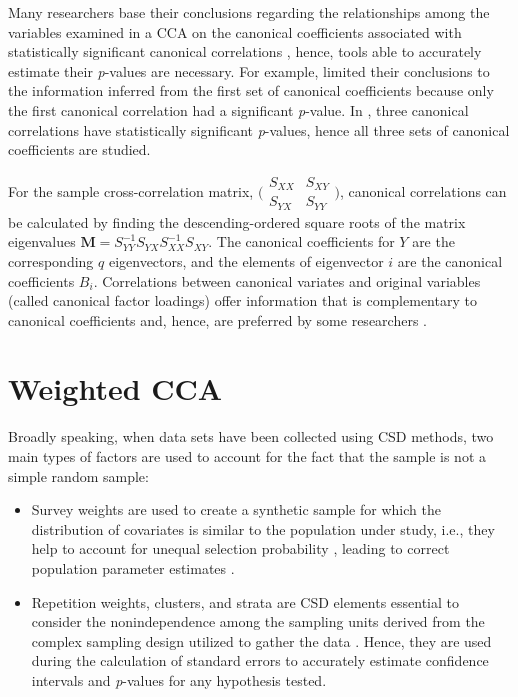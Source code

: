 Many researchers base their conclusions regarding the relationships among the variables examined in a CCA on the canonical coefficients associated with statistically significant canonical correlations \citep{boedeker2020} \citep{statsoft1997}, hence, tools able to accurately estimate their \emph{p}-values are necessary. For example, \citep{trav2014} limited their conclusions to the information inferred from the first set of canonical coefficients because only the first canonical correlation had a significant \emph{p}-value. In \citep{stow1980}, three canonical correlations have statistically significant \emph{p}-values, hence all three sets of canonical coefficients are studied.

For the sample cross-correlation matrix,
\(\big(\begin{smallmatrix}  S_{XX} & S_{XY}\\  S_{YX} & S_{YY} \end{smallmatrix}\big)\),
canonical correlations can be calculated by finding the descending-ordered square roots of the matrix eigenvalues \(\mathbf{M} = S_{YY}^{-1}S_{YX}S_{XX}^{-1}S_{XY}\). The canonical coefficients for \(Y\) are the corresponding \(q\) eigenvectors, and the elements of eigenvector \(i\) are the canonical coefficients \(B_i\). Correlations between canonical variates and original variables (called canonical factor loadings) offer information that is complementary to canonical coefficients and, hence, are preferred by some researchers \citep{mered1964}.

\hypertarget{weighted-cca}{%
\section{Weighted CCA}\label{weighted-cca}}

Broadly speaking, when data sets have been collected using CSD methods, two main types of factors are used to account for the fact that the sample is not a simple random sample:

\begin{itemize}
\tightlist
\item
  Survey weights are used to create a synthetic sample for which the distribution of covariates is similar to the population under study, i.e., they help to account for unequal selection probability \citep{hahsvaughn2011}, leading to correct population parameter estimates \citep{lewis2016}.
\item
  Repetition weights, clusters, and strata are CSD elements essential to consider the nonindependence among the sampling units derived from the complex sampling design utilized to gather the data \citep{hahsvaughn2011}. Hence, they are used during the calculation of standard errors to accurately estimate confidence intervals and \emph{p}-values for any hypothesis tested.
\end{itemize}

